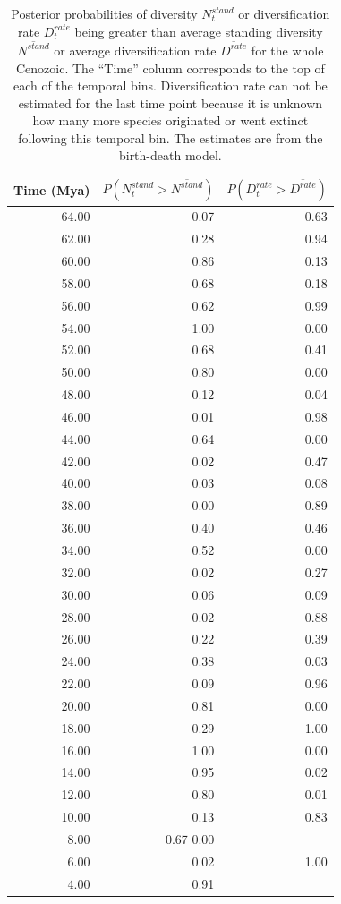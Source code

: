\documentclass[12pt,letterpaper]{article}
\begin{document}
\begin{table}[ht]
  \centering
  \caption[Posterior probability estimates of a peak in diversity, diversification]{Posterior probabilities of diversity \(N^{stand}_{t}\) or diversification rate \(D^{rate}_{t}\) being greater than average standing diversity \(\overline{N^{stand}}\) or average diversification rate \(\overline{D^{rate}}\) for the whole Cenozoic. The ``Time'' column corresponds to the top of each of the temporal bins. Diversification rate can not be estimated for the last time point because it is unknown how many more species originated or went extinct following this temporal bin. The estimates are from the birth-death model.}
  \label{tab:div_peak}
  \begin{tabular}{ r r r }
    \hline
    Time (Mya) & \(P(N^{stand}_{t} > \overline{N^{stand}})\) & \(P(D^{rate}_{t} > \overline{D^{rate}})\) \\ 
    \hline
    64.00 & 0.07 & 0.63 \\ 
    62.00 & 0.28 & 0.94 \\ 
    60.00 & 0.86 & 0.13 \\ 
    58.00 & 0.68 & 0.18 \\ 
    56.00 & 0.62 & 0.99 \\ 
    54.00 & 1.00 & 0.00 \\ 
    52.00 & 0.68 & 0.41 \\ 
    50.00 & 0.80 & 0.00 \\ 
    48.00 & 0.12 & 0.04 \\ 
    46.00 & 0.01 & 0.98 \\ 
    44.00 & 0.64 & 0.00 \\ 
    42.00 & 0.02 & 0.47 \\ 
    40.00 & 0.03 & 0.08 \\ 
    38.00 & 0.00 & 0.89 \\ 
    36.00 & 0.40 & 0.46 \\ 
    34.00 & 0.52 & 0.00 \\ 
    32.00 & 0.02 & 0.27 \\ 
    30.00 & 0.06 & 0.09 \\ 
    28.00 & 0.02 & 0.88 \\ 
    26.00 & 0.22 & 0.39 \\ 
    24.00 & 0.38 & 0.03 \\ 
    22.00 & 0.09 & 0.96 \\ 
    20.00 & 0.81 & 0.00 \\ 
    18.00 & 0.29 & 1.00 \\ 
    16.00 & 1.00 & 0.00 \\ 
    14.00 & 0.95 & 0.02 \\ 
    12.00 & 0.80 & 0.01 \\ 
    10.00 & 0.13 & 0.83 \\ 
    8.00 & 0.67 0.00 \\ 
    6.00 & 0.02 & 1.00 \\ 
    4.00 & 0.91 &  \\ 
    \hline
  \end{tabular}
\end{table}
\end{document}
